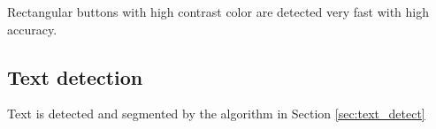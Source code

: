 Rectangular buttons with high contrast color are detected very fast with high accuracy.

\subsection{Text detection}
Text is detected and segmented by the algorithm in Section \ref{sec:text_detect}

	\begin{figure}[H]
	    \centering
	    \qquad
\end{figure}
